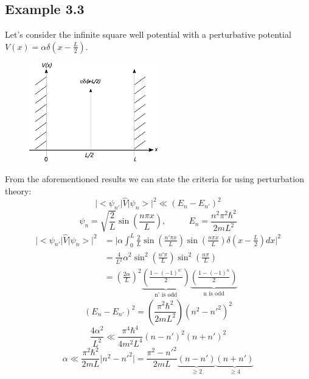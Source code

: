 \documentclass[12pt]{article}
\begin{document}
\subsection{Example 3.3}
Let's consider the infinite square well potential with a perturbative potential $V(x) = \alpha \delta(x-\frac{L}{2})$.
\begin{figure}[h]
  \centering
	\includegraphics[width=0.5\textwidth]{../Figures/delta.pdf}
\end{figure}
From the aforementioned results we can state the criteria for using perturbation theory:
\begin{equation*}
  \boxed{\big|\big<\psi_{n'}\big|\hat{V}\big|\psi_n\big>\big|^2 \ll (E_n - E_{n'})^2}
\end{equation*}
\begin{equation*}
  \boxed{ \psi_n = \sqrt{\frac{2}{L}} \sin \left(\frac{n\pi x}{L}\right),\,\,\,\,\,\,\,\,\,\,\,\,\,\,\,\,
  E_n = \frac{n^2 \pi^2 \hbar^2}{2mL^2}}
\end{equation*}
\begin{align*}
	\big|\big<\psi_{n'}\big|\hat{V}\big|\psi_n\big>\big|^2 & = \Bigg |\alpha\int_{0}^{L}\frac{2}{L}
	\sin\left(\frac{n'\pi x}{L}\right) 	\sin\left(\frac{n\pi x}{L}\right) \delta \left(x - 
	\frac{L}{2}\right)dx\Bigg|^2\\
	& = \frac{4}{L^2}\alpha^2 	\sin^2\left(\frac{n'\pi}{L}\right)\sin^2\left(\frac{n\pi}{L}\right)\\
	& = \left(\frac{2\alpha}{L}\right)^2 \underbrace{\left(\frac{1-(-1)^{n'}}{2}\right)}_\text{n' is
	odd}\underbrace{\left(\frac{1-(-1)^{n}}{2}\right)}_\text{n is odd}
\end{align*}
\begin{equation*}
	(E_n-E_{n'})^2 = \left(\frac{\pi^2 \hbar^2}{2mL^2}\right)(n^2 - n'^2)^2
\end{equation*}
\begin{equation*}
	\frac{4\alpha^2}{L^2} \ll \frac{\pi^4 \hbar^4}{4m^2L^4}(n-n')^2(n+n')^2
\end{equation*}
\begin{equation*}
	\alpha \ll \frac{\pi^2 \hbar^2}{2mL}\big|n^2 - n'^2\big| = \frac{\pi^2 - n'^2}{2mL}
	\underbrace{(n-n')}_{\geq 2}\underbrace{(n+n')}_{\geq 4}
\end{equation*}
\end{document}
